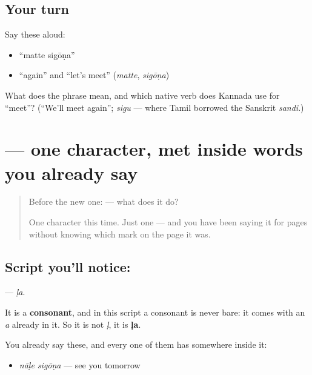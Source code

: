 \subsection*{Your turn}
Say these aloud:

\begin{itemize}
\raggedright
  \item \textquotedblleft{}matte sigōṇa\textquotedblright{}
  \item \textquotedblleft{}again\textquotedblright{} and \textquotedblleft{}let's meet\textquotedblright{} (\emph{matte}, \emph{sigōṇa})
\end{itemize}

\begin{tcolorbox}[breakable,colback=teal!4,colframe=teal!35!black,title={Before you move on}]
What does the phrase mean, and which native verb does Kannada use for \textquotedblleft{}meet\textquotedblright{}? (\textquotedblleft{}We'll meet again\textquotedblright{}; \emph{sigu} — where Tamil borrowed the Sanskrit \emph{sandi}.)
\end{tcolorbox}
\section[\texorpdfstring{\kn{ಳ} (ḷa)}{ಳ (ḷa)}]{ — one character, met inside words you already say}

\label{lesson:KA-S113-letter-lla}



\begin{quote}
Before the new one:  — what does it do?

One character this time. Just one — and you have been saying it for pages without knowing which mark on the page it was.
\end{quote}

\subsection*{Script you'll notice: }
\textbf{} — \emph{ḷa}.

It is a \textbf{consonant}, and in this script a consonant is never bare: it comes with an \emph{a} already in it. So it is not \emph{ḷ}, it is \textbf{ḷa}.

You already say these, and every one of them has  somewhere inside it:

\begin{itemize}
\raggedright
  \item \textbf{ } \emph{nāḷe sigōṇa} — see you tomorrow
\end{itemize}

